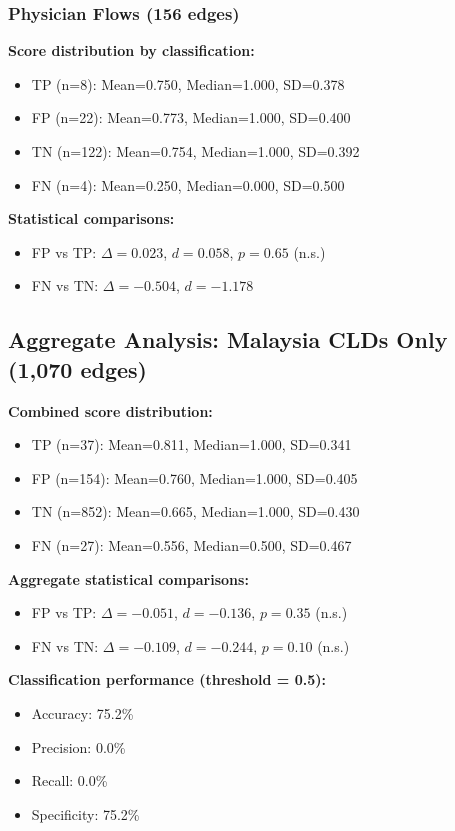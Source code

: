 \subsubsection{Physician Flows (156 edges)}

\textbf{Score distribution by classification:}
\begin{itemize}
    \item TP (n=8): Mean=0.750, Median=1.000, SD=0.378
    \item FP (n=22): Mean=0.773, Median=1.000, SD=0.400
    \item TN (n=122): Mean=0.754, Median=1.000, SD=0.392
    \item FN (n=4): Mean=0.250, Median=0.000, SD=0.500
\end{itemize}

\textbf{Statistical comparisons:}
\begin{itemize}
    \item FP vs TP: $\Delta = 0.023$, $d = 0.058$, $p = 0.65$ (n.s.)
    \item FN vs TN: $\Delta = -0.504$, $d = -1.178$
\end{itemize}

\subsection{Aggregate Analysis: Malaysia CLDs Only (1,070 edges)}

\textbf{Combined score distribution:}
\begin{itemize}
    \item TP (n=37): Mean=0.811, Median=1.000, SD=0.341
    \item FP (n=154): Mean=0.760, Median=1.000, SD=0.405
    \item TN (n=852): Mean=0.665, Median=1.000, SD=0.430
    \item FN (n=27): Mean=0.556, Median=0.500, SD=0.467
\end{itemize}

\textbf{Aggregate statistical comparisons:}
\begin{itemize}
    \item FP vs TP: $\Delta = -0.051$, $d = -0.136$, $p = 0.35$ (n.s.)
    \item FN vs TN: $\Delta = -0.109$, $d = -0.244$, $p = 0.10$ (n.s.)
\end{itemize}

\textbf{Classification performance (threshold = 0.5):}
\begin{itemize}
    \item Accuracy: 75.2\%
    \item Precision: 0.0\%
    \item Recall: 0.0\%
    \item Specificity: 75.2\%
\end{itemize}

